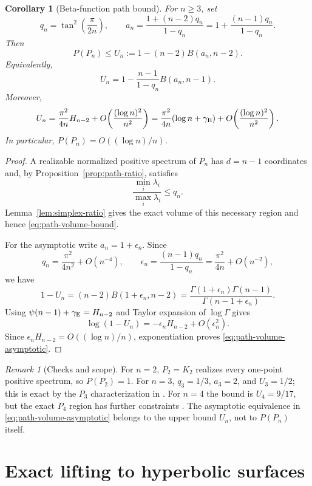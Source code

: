 \documentclass[11pt,reqno]{amsart}
\newtheorem{corollary}[theorem]{Corollary}
\theoremstyle{definition}
\theoremstyle{remark}
\newtheorem{remark}[theorem]{Remark}
\begin{document}
\begin{corollary}[Beta-function path bound]\label{cor:path-volume}
For $n\ge3$, set
\[
 q_n=\tan^2\!\left(\frac{\pi}{2n}\right),\qquad
 a_n=\frac{1+(n-2)q_n}{1-q_n}
     =1+\frac{(n-1)q_n}{1-q_n}.
\]
Then
\begin{equation}\label{eq:path-volume-bound}
 \boxed{\quad P(P_n)\le U_n:=1-(n-2)B(a_n,n-2).\quad}
\end{equation}
Equivalently,
\[
 U_n=1-\frac{n-1}{1-q_n}B(a_n,n-1).
\]
Moreover,
\begin{equation}\label{eq:path-volume-asymptotic}
 U_n=\frac{\pi^2}{4n}H_{n-2}
 +O\!\left(\frac{(\log n)^2}{n^2}\right)
 =\frac{\pi^2}{4n}(\log n+\gamma_{\rm E})
 +O\!\left(\frac{(\log n)^2}{n^2}\right).
\end{equation}
In particular, $P(P_n)=O((\log n)/n)$.
\end{corollary}

\begin{proof}
A realizable normalized positive spectrum of $P_n$ has $d=n-1$ coordinates
and, by Proposition~\ref{prop:path-ratio}, satisfies
\[
 \frac{\min_i\lambda_i}{\max_i\lambda_i}\le q_n.
\]
Lemma~\ref{lem:simplex-ratio} gives the exact volume of this necessary
region and hence \eqref{eq:path-volume-bound}.

For the asymptotic write $a_n=1+\epsilon_n$.  Since
\[
 q_n=\frac{\pi^2}{4n^2}+O(n^{-4}),\qquad
 \epsilon_n=\frac{(n-1)q_n}{1-q_n}
 =\frac{\pi^2}{4n}+O(n^{-2}),
\]
we have
\[
 1-U_n=(n-2)B(1+\epsilon_n,n-2)
 =\frac{\Gamma(1+\epsilon_n)\Gamma(n-1)}
        {\Gamma(n-1+\epsilon_n)}.
\]
Using $\psi(n-1)+\gamma_{\rm E}=H_{n-2}$ and Taylor expansion of
$\log\Gamma$ gives
\[
 \log(1-U_n)=-\epsilon_nH_{n-2}+O(\epsilon_n^2).
\]
Since $\epsilon_nH_{n-2}=O((\log n)/n)$, exponentiation proves
\eqref{eq:path-volume-asymptotic}.
\end{proof}

\begin{remark}[Checks and scope]
For $n=2$, $P_2=K_2$ realizes every one-point positive spectrum, so
$P(P_2)=1$.  For $n=3$, $q_3=1/3$, $a_3=2$, and $U_3=1/2$; this is exact
by the $P_3$ characterization in \cite{FGL2025}.  For $n=4$ the bound is
$U_4=9/17$, but the exact $P_4$ region has further constraints
\cite{EJT2026}.  The asymptotic equivalence in
\eqref{eq:path-volume-asymptotic} belongs to the upper bound $U_n$, not to
$P(P_n)$ itself.
\end{remark}

\section{Exact lifting to hyperbolic surfaces}\label{sec:surface}
\end{document}

